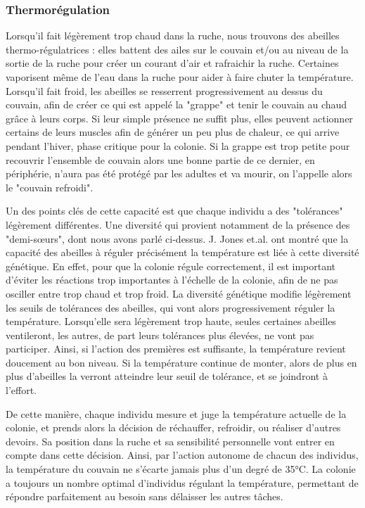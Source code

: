 			\subsubsection{Thermorégulation}	
			
			Lorsqu'il fait légèrement trop chaud dans la ruche, nous trouvons des abeilles thermo-régulatrices : elles battent des ailes sur le couvain et/ou au niveau de la sortie de la ruche pour créer un courant d'air et rafraichir la ruche. Certaines vaporisent même de l'eau dans la ruche pour aider à faire chuter la température. Lorsqu'il fait froid, les abeilles se resserrent progressivement au dessus du couvain, afin de créer ce qui est appelé la "grappe" et tenir le couvain au chaud grâce à leurs corps. Si leur simple présence ne suffit plus, elles peuvent actionner certains de leurs muscles afin de générer un peu plus de chaleur, ce qui arrive pendant l'hiver, phase critique pour la colonie. Si la grappe est trop petite pour recouvrir l'ensemble de couvain alors une bonne partie de ce dernier, en périphérie, n'aura pas été protégé par les adultes et va mourir, on l'appelle alors le "couvain refroidi".
					
			Un des points clés de cette capacité est que chaque individu a des "tolérances" légèrement différentes. Une diversité qui provient notamment de la présence des "demi-sœurs", dont nous avons parlé ci-dessus. J. Jones et.al. \cite{jones_honey_2004} ont montré que la capacité des abeilles à réguler précisément la température est liée à cette diversité génétique. En effet, pour que la colonie régule correctement, il est important d'éviter les réactions trop importantes à l'échelle de la colonie, afin de ne pas osciller entre trop chaud et trop froid. La diversité génétique modifie légèrement les seuils de tolérances des abeilles, qui vont alors progressivement réguler la température. Lorsqu'elle sera légèrement trop haute, seules certaines abeilles ventileront, les autres, de part leurs tolérances plus élevées, ne vont pas participer. Ainsi, si l'action des premières est suffisante, la température revient doucement au bon niveau. Si la température continue de monter, alors de plus en plus d'abeilles la verront atteindre leur seuil de tolérance, et se joindront à l'effort.
			
			De cette manière, chaque individu mesure et juge la température actuelle de la colonie, et prends alors la décision de réchauffer, refroidir, ou réaliser d'autres devoirs. Sa position dans la ruche et sa sensibilité personnelle vont entrer en compte dans cette décision. Ainsi, par l'action autonome de chacun des individus, la température du couvain ne s'écarte jamais plus d'un degré de 35°C. La colonie a toujours un nombre optimal d'individus régulant la température, permettant de répondre parfaitement au besoin sans délaisser les autres tâches.
			
